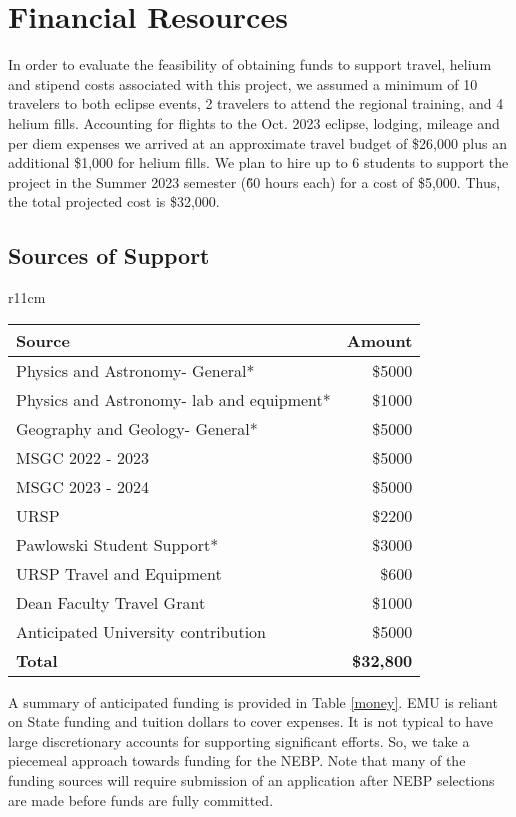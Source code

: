 \documentclass[12pt]{article}
\begin{document}
\newpage

\section{Financial Resources}
\vspace{-.15in}
In order to evaluate the feasibility of obtaining funds to support travel,
helium and stipend costs associated with this project, we
assumed a minimum of 10 travelers to both eclipse events, 2 travelers
to attend the regional training, and 4 helium fills. Accounting for
flights to the Oct. 2023 eclipse, lodging, mileage and per diem expenses we
arrived at an approximate travel budget of \$26,000
plus an additional \$1,000 for helium fills.
We plan to hire up to
6 students to support the project in the Summer 2023 semester (\~ 60 hours each)
for a cost of \$5,000.
Thus, the total projected cost is \$32,000.

\vspace{-.1in}
\subsection{Sources of Support}
\vspace{-.1in}
\begin{wraptable}{r}{11cm}
  \vspace{-.2in}

  \centering
  \begin{tabular}{|l|r|}
  \hline
  Source&Amount\\
  \hline
  Physics and Astronomy- General*&\$5000\\
  Physics and Astronomy- lab and equipment*&\$1000\\
  Geography and Geology- General*&\$5000\\
  MSGC 2022 - 2023&\$5000\\
  MSGC 2023 - 2024&\$5000\\
  URSP&\$2200\\
  Pawlowski Student Support*& \$3000\\
  URSP Travel and Equipment&\$600\\
  Dean Faculty Travel Grant&\$1000\\
  Anticipated University contribution&\$5000\\
  \hline
  {\bf Total}&{\bf \$32,800}\\
  \hline
  \end{tabular}
  \caption{\small Anticipated sources of financial support for travel and equipment.
  * indicates funds are already committed.}
  \label{money}
  \vspace{-.2in}
  \end{wraptable}
A summary of anticipated funding is provided in Table \ref{money}.
EMU is reliant on State funding and tuition dollars to cover expenses. It is
not typical to have large discretionary accounts for supporting significant efforts.
So, we take a piecemeal
approach towards funding for the NEBP. Note that many of the funding sources will
require submission of an application after NEBP selections are made before funds are fully
committed.
\end{document}
